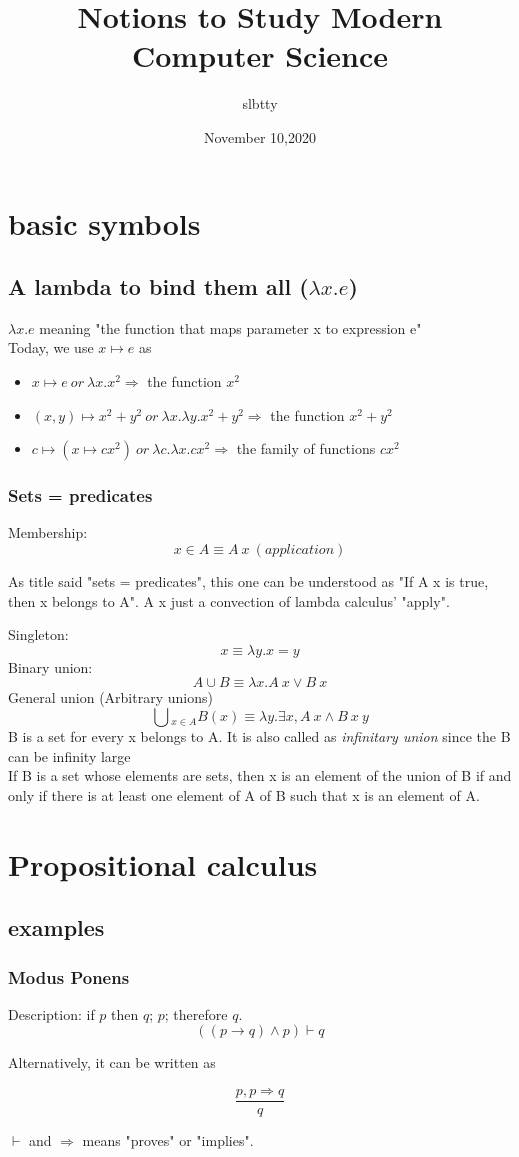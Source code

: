 \documentclass[a4paper]{article}
\title{Notions to Study Modern Computer Science}
\author{slbtty}
\date{November 10,2020}
\begin{document}
\maketitle
\section{basic symbols}

\subsection{A lambda to bind them all ($\lambda x.e$)}
$\lambda x.e$ meaning "the function that maps parameter x to expression e"\\

Today, we use $x \mapsto e$ as

\begin{itemize}
	\item $x \mapsto e\ or\ \lambda x.x^2 \Rightarrow$  the function $x^2$
	\item $(x,y)\mapsto x^2+y^2\ or\ \lambda x.\lambda y.x^2+y^2 \Rightarrow $ the function $x^2+y^2$
	\item $c\mapsto (x\mapsto cx^2)\ or\ \lambda c.\lambda x.cx^2\Rightarrow$ the family of functions $cx^2$
\end{itemize}


\subsubsection{Sets = predicates}
Membership:
\[
x\in A \equiv A\ x\ (application)
\]

As title said "sets = predicates", this one can be understood as "If A x is true, then x belongs to A". A x just a convection of lambda calculus' "apply".

Singleton:
\[
{x}\equiv \lambda y.x = y
\]
Binary union:
\[
A \cup B \equiv \lambda x. A\ x \vee B\ x
\]
General union (Arbitrary unions)
\[
\bigcup\!_{x\in A}B(x) \equiv \lambda y.\exists x, A\ x \wedge B\ x\ y
\]
B is a set for every x belongs to A. It is also called as \textit{infinitary union} since the B can be infinity large\\

If B is a set whose elements are sets, then x is an element of the union of B if and only if there is at least one element of A of B such that x is an element of A.

\section{Propositional calculus}
\subsection{examples}
\subsubsection{Modus Ponens}
Description: if $p$ then $q$; $p$; therefore $q$.
\[
((p \rightarrow q) \wedge p) \vdash q
\]

Alternatively, it can be written as

\[
\frac{p,p\Rightarrow q}{q}
\]

$\vdash$ and $\Rightarrow$ means "proves" or "implies".
\end{document}
